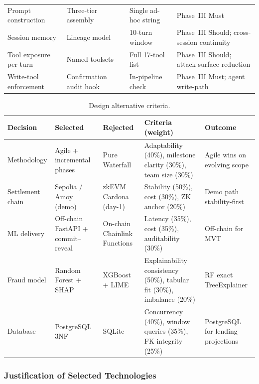 \documentclass[12pt,a4paper]{report}
\newcommand{\tableheadcolor}{\rowcolor{TableHeadBg}}
\begin{document}
\begin{table}[H]
\begin{tabular}{p{3cm}p{3cm}p{3cm}p{4.5cm}}
Prompt construction & Three-tier assembly & Single ad-hoc string & Phase~III Must \\
Session memory & Lineage model & 10-turn window & Phase~III Should; cross-session continuity \\
Tool exposure per turn & Named toolsets & Full 17-tool list & Phase~III Should; attack-surface reduction \\
Write-tool enforcement & Confirmation audit hook & In-pipeline check & Phase~III Must; agent write-path \\
\bottomrule
\end{tabular}
\end{table}

\begin{table}[H]
\centering
\caption[Design alternative criteria]{Design alternative criteria.}
\label{tab:design-alternatives-criteria}
\footnotesize
\begin{tabular}{@{}p{2.6cm}p{2.2cm}p{2.2cm}p{2.8cm}p{3.4cm}@{}}
\toprule
\tableheadcolor
\textbf{Decision} & \textbf{Selected} & \textbf{Rejected} & \textbf{Criteria (weight)} & \textbf{Outcome} \\
\midrule
Methodology & Agile + incremental phases & Pure Waterfall & Adaptability (40\%), milestone clarity (30\%), team size (30\%) & Agile wins on evolving scope \\
Settlement chain & Sepolia / Amoy (demo) & zkEVM Cardona (day-1) & Stability (50\%), cost (30\%), ZK anchor (20\%) & Demo path stability-first \\
ML delivery & Off-chain FastAPI + commit--reveal & On-chain Chainlink Functions & Latency (35\%), cost (35\%), auditability (30\%) & Off-chain for MVT \\
Fraud model & Random Forest + SHAP & XGBoost + LIME & Explainability consistency (50\%), tabular fit (30\%), imbalance (20\%) & RF exact TreeExplainer \\
Database & PostgreSQL 3NF & SQLite & Concurrency (40\%), window queries (35\%), FK integrity (25\%) & PostgreSQL for lending projections \\
\bottomrule
\end{tabular}
\end{table}

\subsubsection{Justification of Selected Technologies}
\end{document}
